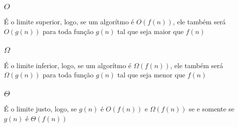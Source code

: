 \documentclass[12pt]{article}
\begin{document}
            \subsubsection{$O$} É o limite superior, logo, se um algorítmo é $O(f(n))$, ele também será $O(g(n))$ para toda função $g(n)$ tal que seja maior que $f(n)$
            \subsubsection{$\Omega$} É o limite inferior, logo, se um algorítmo é $\Omega(f(n))$, ele também será $\Omega(g(n))$ para toda função $g(n)$ tal que seja menor que $f(n)$
            \subsubsection{$\Theta$} É o limite justo, logo, se $g(n)$ é $O(f(n))$ e $\Omega(f(n))$ se e somente se $g(n)$ é $\Theta(f(n))$
\end{document}
